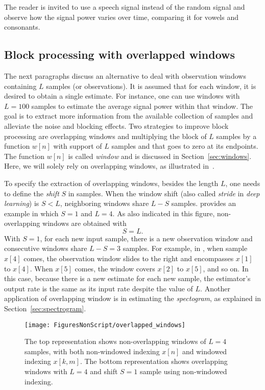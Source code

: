The reader is invited to use a speech signal instead of the random signal and observe
how the signal power varies over time, comparing it for vowels and consonants.
\eExample

\subsection{{\akadvanced} Block processing with overlapped windows}

The next paragraphs discuss an alternative to deal with observation windows containing $L$ samples (or observations).
It is assumed that for each window, it is desired to obtain a single estimate. For instance, one can use windows with $L=100$ samples to estimate the average signal power within that window. The goal is to extract more information from the available collection of samples and alleviate the noise and blocking effects. Two strategies to improve block processing are overlapping windows and
multiplying the block of $L$ samples by a function $w[n]$ with support of $L$ samples and that goes to zero at its endpoints. The function $w[n]$ is called \emph{window} and is discussed in Section~\ref{sec:windows}. Here, we will solely rely on overlapping windows, as illustrated in~.

To specify the extraction of overlapping windows, besides the length $L$, one needs to define the \emph{shift} $S$ in samples. When the window shift (also called \emph{stride} in \emph{deep learning}) is $S < L$, neighboring windows share $L-S$ samples.  provides an example in which $S=1$ and $L=4$. As also indicated in this figure, non-overlapping windows are obtained with
\begin{equation} 
S = L.
\label{eq:non-overlapping-windows}
\end{equation}
With $S=1$, for each new input sample, there is a new observation window and consecutive windows share $L-S=3$ samples. For example, in , when sample $x[4]$ comes, the observation window slides to the right and encompasses $x[1]$ to $x[4]$. When $x[5]$ comes, the window covers $x[2]$ to $x[5]$, and so on. In this case, because there is a new estimate for each new sample, the estimator's output rate is the same as its input rate despite the value of $L$. Another application of overlapping window is in estimating the \emph{spectogram}, as explained in Section~\ref{sec:spectrogram}.

\begin{figure}
	\centering
		\texttt{[image: FiguresNonScript/overlapped\_windows]}
	\caption{The top representation shows non-overlapping windows of $L=4$ samples, with both non-windowed indexing $x[n]$ and windowed indexing $x[k,m]$. The	bottom representation shows overlapping windows with $L=4$ and shift $S=1$ sample using non-windowed indexing.\label{fig:overlapped_windows}}
\end{figure}

